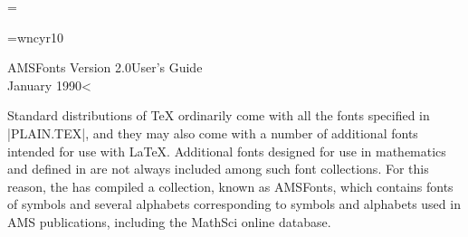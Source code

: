 %
% 
% 
%



\parskip=\smallskipamount

\def\amstexreleasedate{January 1990}
\def\fontsreleasedate{January 1990}

\def\ppcontents{1}
\def\pphistory{6}
\def\ppAMSTeX{8}
\def\ppnonAMSTeX{11}
\def\ppcyrillic{13}
\def\ppsymbols{17}
\def\ppfurtherinfo{22}
\def\ppreflist{23}

\makeatletter
\def\@period{.}
\def\@gobble#1{}
\def\furtherinfo{\futurelet\test@period\check@period}
\def\check@period{the section {\bf For further information}%
  \ifx\test@period .\def\next{.\@gobble}\else \def\next{''}\fi \next }

\def\@Note #1{\def\endx{\ifhmode \unskip\endgraf \fi \endgroup }%
  \ifdim\lastskip>\medskipamount \else \removelastskip\medskip \fi
  \begingroup
  \leftskip=3pc \rightskip=\leftskip
  \interlinepenalty=10000
  \noindent
  {\bf\ignorespaces#1\unskip: } \ignorespaces }
\def\Note{\@Note{Note}}
\def\Warn{\@Note{Warning}}

\def\<#1>{$\langle${\rm #1\/}$\rangle$}

\def\filename#1{\leavevmode\hbox{\tt\ignorespaces#1\unskip}}
\def\fontname#1{\leavevmode\hbox{\ignorespaces#1\unskip}}       
\makeatother


\font\tencyr=wncyr10
\def\cyr{\tencyr\cyracc}



\maintitle AMSFonts Version 2.0\Dash User's Guide\\
  \fontsreleasedate<

Standard distributions of \TeX{} ordinarily come with all the fonts
specified in |PLAIN.TEX|, and they may also come with a number of
additional fonts intended for use with \LaTeX.  Additional fonts
designed for use in mathematics and defined in \AmSTeX{} are not always
included among such font collections.  For this reason, the \AMS{} has
compiled a collection, known as AMSFonts, which contains fonts of
symbols and several alphabets corresponding to symbols and alphabets
used in AMS publications, including the MathSci online database.

